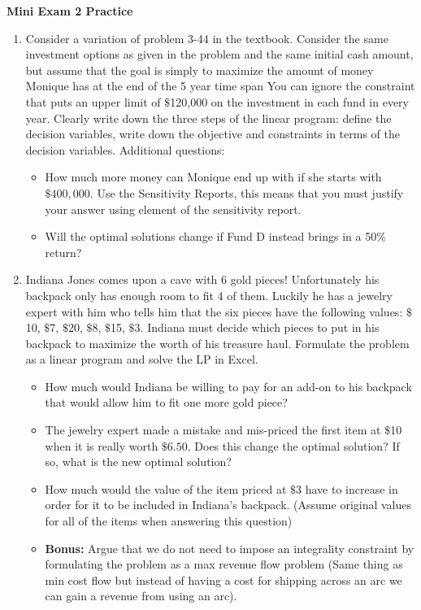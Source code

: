 \documentclass{article}[11 pt]    %
\begin{document}
\begin{center}
\textbf{Mini Exam 2 Practice}\\[.1cm]
\end{center}

\begin{enumerate}
\item Consider a variation of problem 3-44 in the textbook.  Consider the same investment options as given in the problem and the same initial cash amount, but assume that the goal is simply to maximize the amount of money Monique has at the end of the 5 year time span  You can ignore the constraint that puts an upper limit of $\$$120,000 on the investment in each fund in every year.  Clearly write down the three steps of the linear program: define the decision variables, write down the objective and constraints in terms of the decision variables.
Additional questions:
\begin{itemize}
\item How much more money can Monique end up with if she starts with $\$400,000$. Use the Sensitivity Reports, this means that you must justify your answer using element of the sensitivity report.
\item Will the optimal solutions change if Fund D instead brings in a 50$\%$ return?
\end{itemize}
\item Indiana Jones comes upon a cave with 6 gold pieces!  Unfortunately his backpack only has enough room to fit 4 of them.  Luckily he has a jewelry expert with him who tells him that the six pieces have the following values: $\$$10, $\$$7, $\$$20, $\$$8, $\$$15, $\$$3.  Indiana must decide which pieces to put in his backpack to maximize the worth of his treasure haul.  Formulate the problem as a linear program and solve the LP in Excel. 
\begin{itemize}
\item How much would Indiana be willing to pay for an add-on to his backpack that would allow him to fit one more gold piece?
\item The jewelry expert made a mistake and mis-priced the first item at $\$$10 when it is really worth $\$6.50$.  Does this change the optimal solution?  If so, what is the new optimal solution?
\item How much would the value of the item priced at $\$$3 have to increase in order for it to be included in Indiana's backpack.  (Assume original values for all of the items when answering this question)
\item \textbf{Bonus:} Argue that we do not need to impose an integrality constraint by formulating the problem as a max revenue flow problem (Same thing as min cost flow but instead of having a cost for shipping across an arc we can gain a revenue from using an arc). 
\end{itemize}
\end{enumerate}
\end{document}
